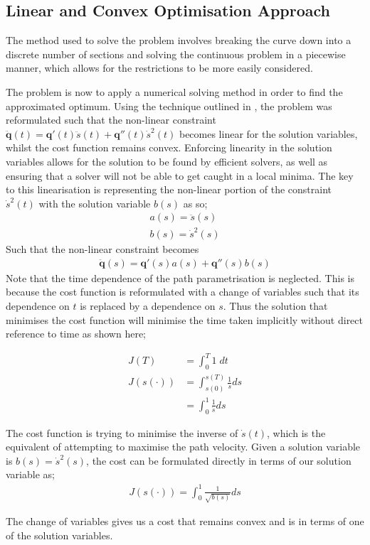 \subsection{Linear and Convex Optimisation Approach}
The method used to solve the problem involves breaking the curve down into a discrete number of sections and solving the continuous problem in a piecewise manner, which allows for the restrictions to be more easily considered.

The problem is now to apply a numerical solving method in order to find the approximated optimum. Using the technique outlined in \cite{Schutter09}, the problem was reformulated such that the non-linear constraint $\ddot{\textbf{q}}(t) = \textbf{q}'(t)\ddot{s}(t) + \textbf{q}''(t)\dot{s}^2(t)$ becomes linear for the solution variables, whilst the cost function remains convex. Enforcing linearity in the solution variables allows for the solution to be found by efficient solvers, as well as ensuring that a solver will not be able to get caught in a local minima.
The key to this linearisation is representing the non-linear portion of the constraint $\dot{s}^2(t)$ with the solution variable $b(s)$ as so;
\begin{align*}
a(s) = \ddot{s}(s)\\
b(s) = \dot{s}^2(s)
\end{align*}
Such that the non-linear constraint becomes
\begin{align*}
\ddot{\textbf{q}}(s) = \textbf{q}'(s)a(s) + \textbf{q}''(s)b(s)
\end{align*}
Note that the time dependence of the path parametrisation is neglected. This is because the cost function is reformulated with a change of variables such that its dependence on $t$ is replaced by a dependence on $s$. Thus the solution that minimises the cost function will minimise the time taken implicitly without direct reference to time as shown here;

\begin{align*}
J(T) &= \int_0^T1\;dt\\
J(s(\cdot)) &= \int_{s(0)}^{s(T)} \frac{1}{\dot{s}}ds\\
	&= \int_0^1\frac{1}{\dot{s}}ds
\end{align*}

The cost function is trying to minimise the inverse of $\dot{s}(t)$, which is the equivalent of attempting to maximise the path velocity. Given a solution variable is $b(s) = \dot{s}^2(s)$, the cost can be formulated directly in terms of our solution variable as;
\begin{align*}
J(s(\cdot)) = \int_0^1\frac{1}{\sqrt{b(s)}}ds
\end{align*}

The change of variables gives us a cost that remains convex and is in terms of one of the solution variables.